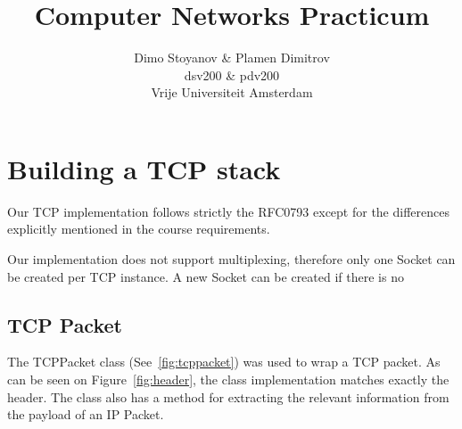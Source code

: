 \documentclass{article}
\title{	\textbf{Computer Networks Practicum}
		}
\author{
		Dimo Stoyanov \& Plamen Dimitrov\\
		dsv200 \& pdv200 \\
		Vrije Universiteit Amsterdam\\	
}
\begin{document}
\maketitle

\section{Building a TCP stack}
Our TCP implementation follows strictly the RFC0793 except for the differences explicitly
mentioned in the course requirements.

Our implementation does not support multiplexing, therefore only one Socket can be created
per TCP instance. A new Socket can be created if there is no

\subsection{TCP Packet}
The TCPPacket class (See~\ref{fig:tcppacket}) was used to wrap a TCP packet. As can be seen
on Figure~\ref{fig:header}, the class implementation matches exactly the header. The class
also has a method for extracting the relevant information from the payload of an IP Packet.
\end{document}
